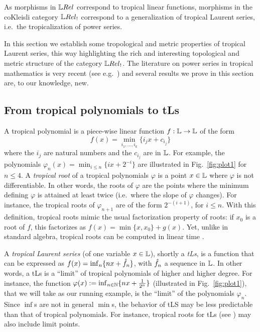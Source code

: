 
As morphisms in $\LREL$ correspond to tropical linear functions, morphisms in the coKleisli category $\LREL_{!}$ 
correspond to a generalization of tropical Laurent series, i.e.~the tropicalization of power series. 

In this section we establish some tropological and metric properties of tropical Laurent series, this way highlighting the rich and interesting topological and metric structure of the category $\LREL_{!}$.
The literature on power series in tropical mathematics is very recent (see e.g.~\cite{Porzio2021}) and several results we prove in this section are, to our knowledge, new.

%

\subsection{From tropical polynomials to tLs}\label{sec:4A}

A tropical polynomial is a piece-wise linear function $f:\mathbb{L}\to \mathbb{L}$ of the form \begin{equation}
f(x)=\min_{i_{1},\dots, i_{k}}\{i_{j}x+c_{i_{j}}\}
\end{equation}
where the $i_{j}$ are natural numbers and the $c_{i_{j}}$ are in $\mathbb{L}$.
For example, the polynomials $\varphi_{n}(x)=\min_{i\leq n}\{ix+2^{-i}\}$
are illustrated in Fig.~\ref{fig:plot1} for $n\leq 4$.
A \emph{tropical root} of a tropical polynomials $\varphi$ is a point $x\in \mathbb{L}$ where $\varphi$ is not differentiable. In other words, the roots of $\varphi$ are the points where the minimum defining $\varphi$ is attained at least twice (i.e.~where the slope of $\varphi$ changes). For instance, the tropical roots of $\varphi_{n+1}$ are of the form $2^{-(i+1)}$, for $i \leq n$.
With this definition, tropical roots mimic the usual factorization property of roots: if $x_{0}$ is a root of $f$, this factorizes as
$f(x)=\min\{x,x_{0}\}+ g(x)$. Yet, unlike in standard algebra, tropical roots can be computed in linear time \cite{Noferini2015}.
%



A \emph{tropical Laurent series} (of one variable $x\in\mathbb{L}$), shortly a \emph{tLs}, is a function that can be expressed as $f(x)=\inf_{n}\{nx+\hat{f}_{n}\}$, with $\hat{f}_{n}$ a sequence in $\mathbb{L}$. In other words, a tLs is a ``limit'' of tropical polynomials of higher and higher degree. For instance, the function $\varphi(x):=\inf_{n\in\mathbb{N}}\{nx+\frac{1}{2^n}\}$ (illustrated in Fig.~\ref{fig:plot1}), that we will take as our running example, 
is the ``limit'' of the polynomials $\varphi_{n}$. Since $\inf$s are not in general $\min$s, the behavior of tLS may be less predictable than that of tropical polynomials. For instance, tropical roots for tLs (see \cite{Porzio2021}) may also include limit points.

